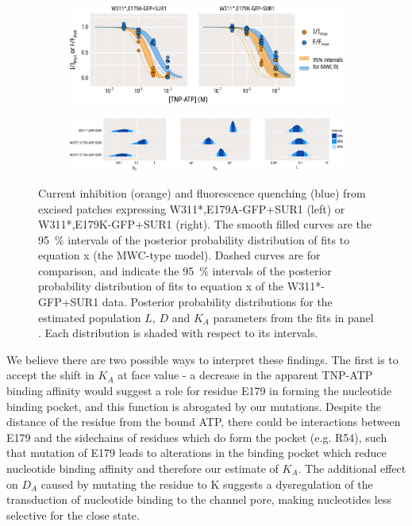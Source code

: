 \begin{figure}[h]
	\centering
	\begin{subfigure}[t]{0.9\textwidth}
		\caption{}\label{ch5fig:mwc_e179_1}
		\centering
		\includegraphics[width=\textwidth]{mwc_e179_1.pdf}
	\end{subfigure}
	\vfill
	\begin{subfigure}[t]{0.9\textwidth}
		\caption{}\label{ch5fig:mwc_e179_2}
		\centering
		\includegraphics[width=\textwidth]{mwc_e179_2.pdf}
	\end{subfigure}
	\caption[E179 mutations affect gating and nucleotide binding]{
	 Current inhibition (orange) and fluorescence quenching (blue) from excised patches expressing W311*,E179A-GFP+SUR1 (left) or W311*,E179K-GFP+SUR1 (right).
	The smooth filled curves are the \SI{95}{\percent} intervals of the posterior probability distribution of fits to equation x (the MWC-type model).
	Dashed curves are for comparison, and indicate the \SI{95}{\percent} intervals of the posterior probability distribution of fits to equation x of the W311*-GFP+SUR1 data.
	 Posterior probability distributions for the estimated population $L$, $D$ and $K_A$ parameters from the fits in panel .
	Each distribution is shaded with respect to its intervals.
	}\label{ch5fig:e179_2}
\end{figure}

We believe there are two possible ways to interpret these findings.
The first is to accept the shift in $K_A$ at face value - a decrease in the apparent TNP-ATP binding affinity would suggest a role for residue E179 in forming the nucleotide binding pocket, and this function is abrogated by our mutations.
Despite the distance of the residue from the bound ATP, there could be interactions between E179 and the sidechains of residues which do form the pocket (e.g. R54), such that mutation of E179 leads to alterations in the binding pocket which reduce nucleotide binding affinity and therefore our estimate of $K_A$.
The additional effect on $D_A$ caused by mutating the residue to K suggests a dysregulation of the transduction of nucleotide binding to the channel pore, making nucleotides less selective for the close state.

